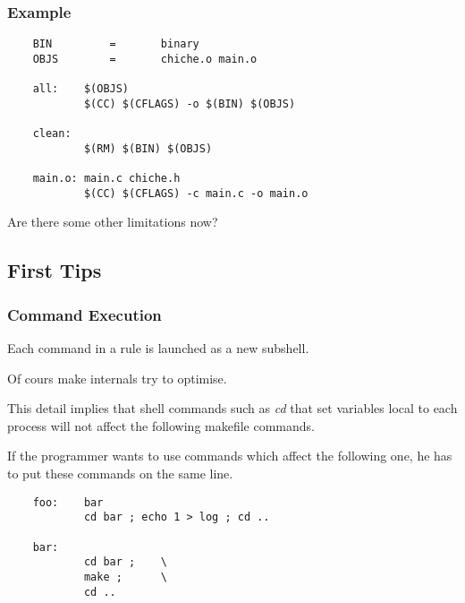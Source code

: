 
\begin{frame}[containsverbatim]
  \frametitle{Example}

  \begin{verbatim}
    BIN         =       binary
    OBJS        =       chiche.o main.o

    all:    $(OBJS)
            $(CC) $(CFLAGS) -o $(BIN) $(OBJS)

    clean:
            $(RM) $(BIN) $(OBJS)

    main.o: main.c chiche.h
            $(CC) $(CFLAGS) -c main.c -o main.o
  \end{verbatim}

  Are there some other limitations now?
\end{frame}

%
%

\subsection{First Tips}


\begin{frame}[containsverbatim]
  \frametitle{Command Execution}

  Each command in a rule is launched as a new subshell.

  \nl

  Of cours make internals try to optimise.

  \nl

  This detail implies that shell commands such as \textit{cd} that set
  variables local to each process will not affect the following makefile
  commands.

  \nl

  If the programmer wants to use commands which affect the following one, he
  has to put these commands on the same line.

  \begin{verbatim}
    foo:    bar
            cd bar ; echo 1 > log ; cd ..

    bar:
            cd bar ;    \
            make ;      \
            cd ..
  \end{verbatim}
\end{frame}


